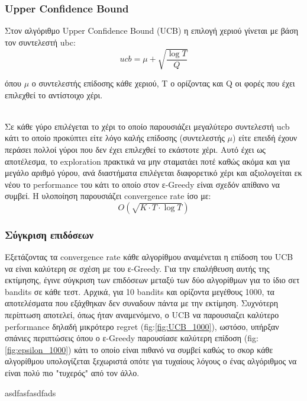 \subsubsection*{Upper Confidence Bound}
\noindent
Στον αλγόριθμο Upper Confidence Bound (UCB) η επιλογή χεριού γίνεται με βάση τον συντελεστή ubc:
\begin{equation*}
	ucb = \mu + \sqrt{\frac{\log T}{Q} }
\end{equation*}

όπου $\mu$ ο συντελεστής επίδοσης κάθε χεριού, Τ ο ορίζοντας και Q οι φορές που έχει επιλεχθεί το αντίστοιχο χέρι.

\noindent\\
Σε κάθε γύρο επιλέγεται το χέρι το οποίο παρουσιάζει μεγαλύτερο συντελεστή ucb κάτι το οποίο προκύπτει είτε λόγο καλής επίδοσης (συντελεστής $\mu$) είτε επειδή έχουν περάσει πολλοί γύροι που δεν έχει επιλεχθεί το εκάστοτε χέρι. Αυτό έχει ως αποτέλεσμα, το exploration πρακτικά να μην σταματάει ποτέ καθώς ακόμα και για μεγάλο αριθμό γύρου, ανά διαστήματα επιλέγεται διαφορετικό χέρι και αξιολογείται εκ νέου το performance του κάτι το οποίο στον ε-Greedy είναι σχεδόν απίθανο να συμβεί.  Η υλοποίηση παρουσιάζει convergence rate ίσο με:
\begin{equation}
	O\left( \sqrt{K \cdot T \cdot \log T}\right)
\end{equation}


\subsubsection*{Σύγκριση επιδόσεων}
\begin{minipage}{.7\textwidth}
	Εξετάζοντας τα convergence rate κάθε αλγορίθμου αναμένεται η επίδοση του UCB να είναι καλύτερη σε σχέση με του ε-Greedy. Για την επαλήθευση αυτής της εκτίμησης, έγινε σύγκριση των επιδόσεων μεταξύ των δύο αλγορίθμων για το ίδιο σετ bandits σε κάθε τεστ. Αρχικά, για 10 bandits και ορίζοντα μεγέθους 1000, τα αποτελέσματα που εξάχθηκαν δεν συναδουν πάντα με την εκτίμηση. Συχνότερη περίπτωση αποτελεί, όπως ήταν αναμενόμενο, ο UCB να παρουσιαζει καλύτερο performance δηλαδή μικρότερο regret (fig:\ref{fig:UCB_1000}), ωστόσο, υπήρξαν σπάνιες περιπτώσεις όπου ο ε-Greedy παρουσίασε καλύτερη επίδοση (fig:\ref{fig:epsilon_1000}) κάτι το οποίο είναι πιθανό να συμβεί καθώς το σκορ κάθε αλγορίθμου υπολογίζεται ξεχωριστά οπότε για τυχαίους λόγους ο ένας αλγόριθμος να είναι πολύ πιο "τυχερός" από τον άλλο. \end{minipage}
\begin{minipage}{.3\textwidth}
asdfasfasdfads
\end{minipage}

